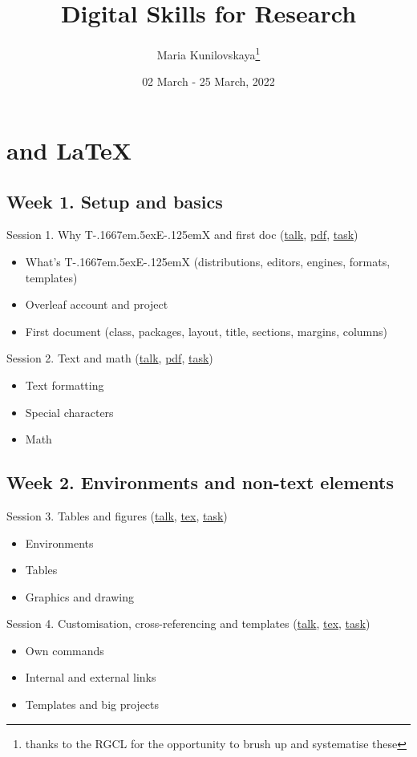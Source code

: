 \documentclass[a4paper,12pt]{article} %
\title{Digital Skills for Research}
\author{Maria Kunilovskaya\thanks{thanks to the RGCL for the opportunity to brush up and systematise these}}
\date{02 March - 25 March, 2022}
\def\TeX{{\rm T\kern-.1667em\lower.5ex\hbox{E}\kern-.125emX }}
\begin{document}
	
	\maketitle

\vspace{-2em}

\section{{\color{red}\TeX and \LaTeX}}

\subsection{Week 1. Setup and basics}
	Session 1. Why \TeX and first doc (\href{}{talk}, \href{https://github.com/kunilovskaya/dskills_workshop/blob/main/w1_latex_basics/s1/session1.pdf}{pdf}, \href{https://github.com/kunilovskaya/dskills_workshop/blob/main/w1_latex_basics/s1/practice1.tex}{task})
		\begin{itemize}
			\item What's \TeX (distributions, editors, engines, formats, templates)
			\item Overleaf account and project
			\item First document (class, packages, layout, title, sections, margins, columns)
		\end{itemize} 
	Session 2. Text and math (\href{}{talk}, \href{https://github.com/kunilovskaya/dskills_workshop/blob/main/w1_latex_basics/s2/session2.pdf}{pdf}, \href{https://github.com/kunilovskaya/dskills_workshop/blob/main/w1_latex_basics/s2/practice2.pdf}{task})
		\begin{itemize}
			\item Text formatting
			\item Special characters
			\item Math
		\end{itemize}

\subsection*{Week 2. Environments and non-text elements}
	Session 3. Tables and figures (\href{}{talk}, \href{}{tex}, \href{}{task})
			\begin{itemize}
				\item Environments
				\item Tables
				\item Graphics and drawing
			\end{itemize}
	Session 4. Customisation, cross-referencing and templates (\href{}{talk}, \href{}{tex}, \href{}{task})
			\begin{itemize}
				\item Own commands
				\item Internal and external links
				\item Templates and big projects
			\end{itemize}
		
\end{document}
